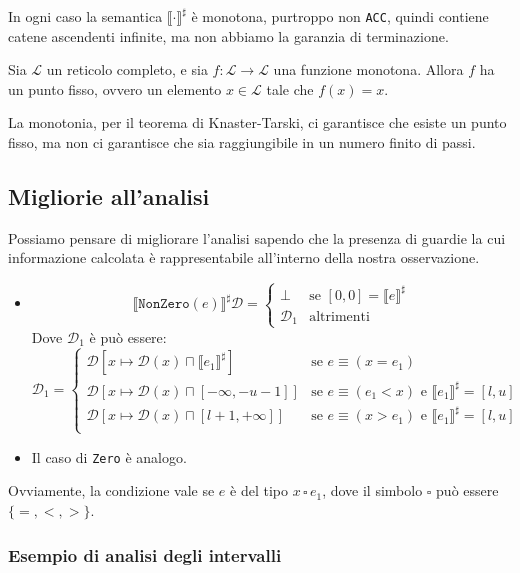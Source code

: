 In ogni caso la semantica $\llbracket \cdot \rrbracket^\sharp$ è monotona, 
purtroppo non \texttt{ACC}, quindi contiene catene ascendenti infinite,
ma non abbiamo la garanzia di terminazione.
\begin{theorem}
    Sia $\mathcal{L}$ un reticolo completo, e sia $f : \mathcal{L} \to \mathcal{L}$ 
    una funzione monotona. Allora $f$ ha un punto fisso, ovvero un elemento $x \in \mathcal{L}$ 
    tale che $f(x) = x$.
\end{theorem}
La monotonia, per il teorema di Knaster-Tarski, ci garantisce che
esiste un punto fisso, ma non ci garantisce che sia raggiungibile
in un numero finito di passi.
\subsection{Migliorie all'analisi}
Possiamo pensare di migliorare l'analisi sapendo che la presenza di guardie la cui 
informazione calcolata è rappresentabile all'interno della nostra osservazione.
\begin{itemize}
    \item 
    \[
      \llbracket \texttt{NonZero}(e) \rrbracket^\sharp \mathcal{D} =
    \begin{cases}
        \bot & \text{se } [0, 0] = \llbracket e \rrbracket^\sharp \\
        \mathcal{D}_1 & \text{altrimenti}
    \end{cases}  
    \]
    Dove $\mathcal{D}_1$ è può essere:
    \[
        \mathcal{D}_1 = \begin{cases}
            \mathcal{D}[x \mapsto \mathcal{D}(x) \sqcap \llbracket e_1 \rrbracket^\sharp] & 
            \text{se } e \equiv (x = e_1) \\
            \mathcal{D}[x \mapsto \mathcal{D}(x) \sqcap [-\infty, -u - 1]] &
            \text{se } e \equiv (e_1 < x) \text{ e } \llbracket e_1 \rrbracket^\sharp = [l, u] \\
            \mathcal{D}[x \mapsto \mathcal{D}(x) \sqcap [l + 1, +\infty]] &
            \text{se } e \equiv (x > e_1) \text{ e } \llbracket e_1 \rrbracket^\sharp = [l, u] \\
        \end{cases}
    \] 
    \item Il caso di \texttt{Zero} è analogo.
\end{itemize}
Ovviamente, la condizione vale se $e$ è del tipo $x \,\square \,e_1$, 
dove il simbolo $\square$ può essere $\{ =, <, > \}$.
\subsubsection{Esempio di analisi degli intervalli}

